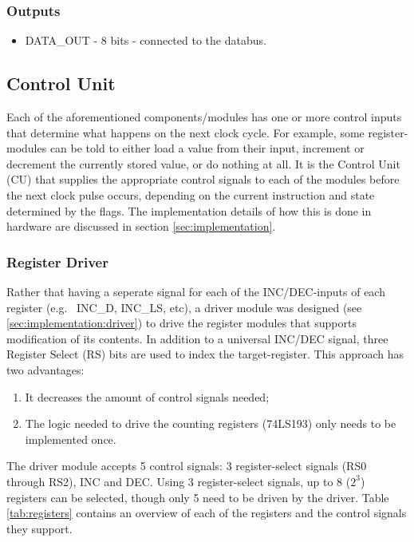 \subsubsection*{Outputs}
\begin{itemize}
\itemsep0em 
\item DATA\_OUT - 8 bits - connected to the databus.
\end{itemize}

\subsection{Control Unit} \label{sec:architecture:cu}
Each of the aforementioned components/modules has one or more control inputs that determine what happens on the next clock cycle. For example, some register-modules can be told to either load a value from their input, increment or decrement the currently stored value, or do nothing at all. It is the Control Unit (CU) that supplies the appropriate control signals to each of the modules before the next clock pulse occurs, depending on the current instruction and state determined by the flags. The implementation details of how this is done in hardware are discussed in section \ref{sec:implementation}.

\subsubsection*{Register Driver} \label{sec:architecture:cu:driver}
Rather that having a seperate signal for each of the INC/DEC-inputs of each register (e.g.~ INC\_D, INC\_LS, etc), a driver module was designed (see \ref{sec:implementation:driver}) to drive the register modules that supports modification of its contents. In addition to a universal INC/DEC signal, three Register Select (RS) bits are used to index the target-register. This approach has two advantages:
\begin{enumerate}
\item It decreases the amount of control signals needed;
\item The logic needed to drive the counting registers (74LS193) only needs to be implemented once.
\end{enumerate}

The driver module accepts 5 control signals: 3 register-select signals (RS0 through RS2), INC and DEC. Using 3 register-select signals, up to 8 ($2^3$) registers can be selected, though only 5 need to be driven by the driver. Table \ref{tab:registers} contains an overview of each of the registers and the control signals they support.

